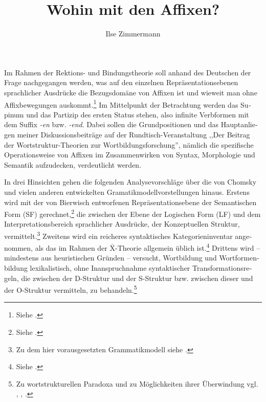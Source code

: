 \documentclass[output=paper,colorlinks,citecolor=brown, booklanguage=german]{langscibook}
\author{Ilse Zimmermann\affiliation{Zentralinstitut für Sprachwissenschaft der Akademie der Wissenschaften der DDR, Berlin}}
\title{Wohin mit den Affixen?}
\begin{document}
\begin{otherlanguage}{german}
\maketitle

%
\noindent 
Im Rahmen der Rektions- und Bindungstheorie soll anhand des Deutschen der Frage nachgegangen werden, was auf den einzelnen Repräsentationsebenen sprachlicher Ausdrücke die Bezugsdomäne von Affixen ist und wieweit man ohne Affixbewegungen auskommt.\footnote{Siehe \citet{Chomsky1981,Chomsky1982,Chomsky1986}.} Im Mittelpunkt der Betrachtung werden das Supinum und das Partizip des ersten Status stehen, also infinite Verbformen mit dem Suffix \textit{-en} bzw. \textit{-end}. Dabei sollen die Grundpositionen und das Hauptanliegen meiner Diskussionsbeiträge auf der Rundtisch-Veranstaltung ,,Der Beitrag der Wortstruktur-Theorien zur Wortbildungsforschung'', nämlich die spezifische Operationsweise von Affixen im Zusammenwirken von Syntax, Morphologie und Semantik aufzudecken, verdeutlicht werden.

In drei Hinsichten gehen die folgenden Analysevorschläge über die von Chomsky und vielen anderen entwickelten Gramatikmodellvorstellungen hinaus. Erstens wird mit der von Bierwisch entworfenen Repräsentationsebene der Semantischen Form (SF) gerechnet,\footnote{Siehe \citet{Bierwisch1982,Bierwisch1986,Bierwisch1987b,Bierwisch1987a,Bierwisch-Drucka}.} die zwischen der Ebene der Logischen Form (LF) und dem Interpretationsbereich sprachlicher Ausdrücke, der Konzeptuellen Struktur, vermittelt.\footnote{Zu dem hier vorausgesetzten Grammatikmodell siehe \citet{Zimmermann1987b,Zimmermann1987a}.} Zweitens wird ein reicheres syntaktisches Kategorieninventar angenommen, als das im Rahmen der $\bar{\text{X}}$-Theorie allgemein üblich ist.\footnote{Siehe \citet{Zimmermann1985,Zimmermann1987a,Zimmermann1988-druck,Zimmermann1987d}.} Drittens wird -- mindestens aus heuristischen Gründen -- versucht, Wortbildung und Wortformenbildung lexikalistisch, ohne Inanspruchnahme syntakti\-scher Transformationsregeln, die zwischen der D-Struktur und der S-Struktur bzw. zwischen dieser und der O-Struktur vermitteln, zu behandeln.\footnote{Zu wortstrukturellen Paradoxa und zu Möglichkeiten ihrer Überwindung vgl. \citet{Pesetsky1985}, \citet{Bierwisch-Druckb}, \citet{Zimmermann1988}.}


\end{otherlanguage}
\end{document}
